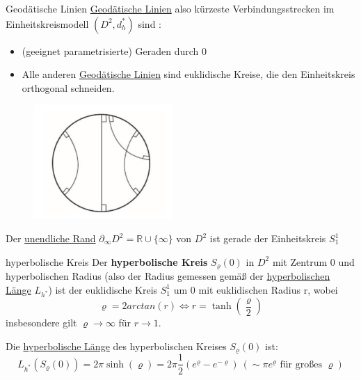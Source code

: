 \newpage
\begin{titleDef}{Geodätische Linien}
\label{geodaetischeLinienEinheitskreis}
\hyperref[geodaetischeLinie]{Geodätische Linien} also kürzeste Verbindungsstrecken im Einheitskreismodell $(D^2,d_h^*)$ sind :
\begin{itemize}
	\item (geeignet parametrisierte) Geraden durch 0
	\item Alle anderen \hyperref[geodaetischeLinie]{Geodätische Linien} sind euklidische Kreise, die den Einheitskreis orthogonal schneiden.
\end{itemize}
\begin{figure}[h]
	\centering
	\includegraphics[width=200px]{Bilder/GeodaetischeEinheitskreis}
	\label{geodaetischeHyperEinheitGrafik}
\end{figure}\par
Der \hyperref[unendlicherRand]{unendliche Rand} $\partial_\infty D^2=\mathbb{R}\cup\{\infty\}$ von $D^2$ ist gerade der Einheitskreis $S_1^1$

\end{titleDef}

\begin{titleDef}{hyperbolische Kreis}
\label{hyperKreis}
Der \textbf{hyperbolische Kreis} $S_\varrho(0)$ in $D^2$ mit Zentrum 0 und hyperbolischen Radius (also der Radius gemessen gemäß der \hyperref[hyperLaenge]{hyperbolischen Länge} $L_{h^*}$) ist der euklidische Kreis $S_1^1$ um 0 mit euklidischen Radius r, wobei
$$\varrho=2arctan(r)\Longleftrightarrow r=\tanh(\frac{\varrho}{2})$$
insbesondere gilt $\varrho\to\infty$ für $r\to 1$.\par
Die \hyperref[hyperLaenge]{hyperbolische Länge} des hyperbolischen Kreises $S_\varrho(0)$ ist:
$$L_{h^*}(S_\varrho(0))=2\pi\sinh(\varrho)=2\pi\frac{1}{2}(e^\varrho-e^{-\varrho})\: (\sim\pi e^\varrho \text{ für großes }\varrho)$$
\end{titleDef}

